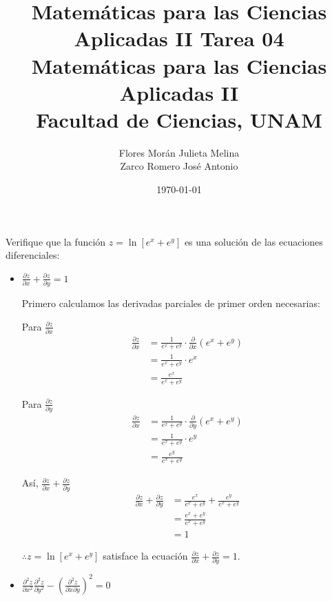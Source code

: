 \documentclass[12pt]{article}
\title{Matemáticas para las Ciencias Aplicadas II}
\title{
        \textbf{Tarea 04} \\
        \vspace{1ex}
        \large Matemáticas para las Ciencias Aplicadas II \\
        Facultad de Ciencias, UNAM}
\date{\today}
\author{Flores Morán Julieta Melina \\ Zarco Romero José Antonio}
\begin{document}
\maketitle

\section{}
Verifique que la función $z = \ln{[e^x + e^y]}$ es una solución de las ecuaciones diferenciales:

\begin{itemize}[format=\textbf]

\item $\frac{\partial z}{\partial x} + \frac{\partial z}{\partial y} = 1$

  Primero calculamos las derivadas parciales de primer orden necesarias:

  Para $\frac{\partial z}{\partial x}$
  \begin{align*}
    \frac{\partial z}{\partial x}
    &= \frac{1}{e^x+e^y} \cdot \frac{\partial}{\partial x} (e^x+e^y) \\
    &= \frac{1}{e^x+e^y} \cdot e^x \\
    &= \frac{e^x}{e^x+e^y}
  \end{align*}

  Para $\frac{\partial z}{\partial y}$
  \begin{align*}
    \frac{\partial z}{\partial x}
    &= \frac{1}{e^x+e^y} \cdot \frac{\partial}{\partial y} (e^x+e^y) \\
    &= \frac{1}{e^x+e^y} \cdot e^y \\
    &= \frac{e^y}{e^x+e^y}
  \end{align*}

  Así, $\frac{\partial z}{\partial x} + \frac{\partial z}{\partial y}$
  \begin{align*}
    \frac{\partial z}{\partial x} + \frac{\partial z}{\partial y} 
    &= \frac{e^x}{e^x+e^y} + \frac{e^y}{e^x+e^y} \\
    &= \frac{e^x + e^y}{e^x+e^y} \\
    &= 1
  \end{align*}

  $\therefore z = \ln{[e^x + e^y]}$ satisface la ecuación $\frac{\partial z}{\partial x} + \frac{\partial z}{\partial y} = 1$.

\item $\frac{\partial^2 z}{\partial x^2} \frac{\partial^2 z}{\partial y^2} - \left( \frac{\partial^2 z}{\partial x \partial y} \right)^2=0$


\end{itemize}
\end{document}
